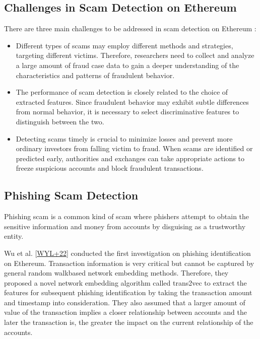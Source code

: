 \documentclass[letterpaper,10pt,english]{jupyterBook}
\begin{document}
\subsection{Challenges in Scam Detection on Ethereum}
\label{\detokenize{SDE/ScamDetec:challenges-in-scam-detection-on-ethereum}}
\sphinxAtStartPar
There are three main challenges to be addressed in scam detection on Ethereum :
\begin{itemize}
\item {} 
\sphinxAtStartPar
{} Different types of scams may employ different methods and strategies, targeting different victims. Therefore, researchers need to collect and analyze a large amount of fraud case data to gain a deeper understanding of the characteristics and patterns of fraudulent behavior.

\item {} 
\sphinxAtStartPar
{} The performance of scam detection is closely related to the choice of extracted features. Since fraudulent behavior may exhibit subtle differences from normal behavior, it is necessary to select discriminative features to distinguish between the two.

\item {} 
\sphinxAtStartPar
{} Detecting scams timely is crucial to minimize losses and prevent more ordinary investors from falling victim to fraud. When scams are identified or predicted early, authorities and exchanges can take appropriate actions to freeze suspicious accounts and block fraudulent transactions.

\end{itemize}


\subsection{Phishing Scam Detection}
\label{\detokenize{SDE/ScamDetec:phishing-scam-detection}}
\begin{sphinxShadowBox}

\sphinxAtStartPar
Phishing scam is a common kind of scam where phishers attempt to obtain the sensitive information and money from accounts by disguising as a trustworthy entity.
\end{sphinxShadowBox}

\sphinxAtStartPar
Wu et al. {[}\hyperlink{cite.SDE/ScamDetec:id134}{WYL+22}{]} conducted the first investigation on phishing identification on Ethereum. Transaction information is very critical but cannot be captured by general random walk\sphinxhyphen{}based network embedding methods. Therefore, they proposed a novel network embedding algorithm called trans2vec to extract the features for subsequent phishing identification by taking the transaction amount and timestamp into consideration. They also assumed that a larger amount of value of the transaction implies a closer relationship between accounts and the later the transaction is, the greater the impact on the current relationship of the accounts.
\end{document}
